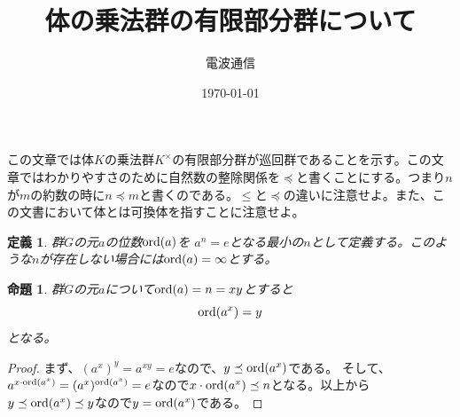\documentclass{jsarticle}
\title{体の乗法群の有限部分群について}
\author{電波通信}
\date{\today}
\newtheorem{prop}[thm]{命題}
\newtheorem{cor}[thm]{系}
\newtheorem{df}[thm]{定義}
\newtheorem{fact}[thm]{事実}
\newcommand{\mgn}{\infty}
\newcommand{\ord}{\text{{\rm ord}}}
\begin{document}
\maketitle

この文章では体$K$の乗法群$K^{\times}$の有限部分群が巡回群であることを示す。この文章ではわかりやすさのために自然数の整除関係を$\preceq$と書くことにする。つまり$n$が$m$の約数の時に$n\preceq m$と書くのである。$\le$と$\preceq$の違いに注意せよ。また、この文書において体とは可換体を指すことに注意せよ。

\begin{df}群$G$の元$a$の位数$\ord(a)$を
$a^n=e$となる最小の$n$として定義する。このような$n$が存在しない場合には$\ord(a)=\mgn$とする。
\end{df}


\begin{prop}
群$G$の元$a$について$\ord(a)=n=xy$とすると
\[
\ord(a^x)=y
\]
となる。
\end{prop}
\begin{proof}
まず、$(a^{x})^y=a^{xy}=e$なので、$y\preceq \ord(a^x)$である。
そして、$a^{x\cdot\ord(a^x)}=(a^{x})^{\ord(a^x)}=e$なので$x\cdot\ord(a^x)\preceq n$となる。以上から$y\preceq \ord(a^x)\preceq y$なので$y=\ord(a^x)$である。
\end{proof}
\end{document}
